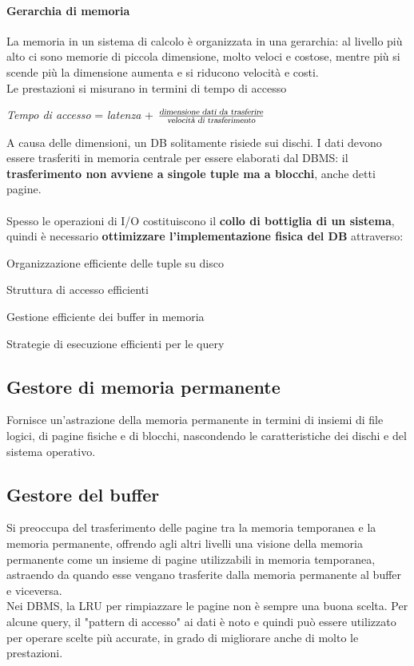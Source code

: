 \documentclass[10pt]{book}
\begin{document}
\paragraph{Gerarchia di memoria} La memoria in un sistema di calcolo è organizzata in una gerarchia: al livello più alto ci sono memorie di piccola dimensione, molto veloci e costose, mentre più si scende più la dimensione aumenta e si riducono velocità e costi.\\
Le prestazioni si misurano in termini di tempo di accesso
\begin{center}
\textsl{Tempo di accesso} = \textsl{latenza} + $\frac{\textsl{dimensione dati da trasferire}}{\textsl{velocità di trasferimento}}$
\end{center}
A causa delle dimensioni, un DB solitamente risiede sui dischi. I dati devono essere trasferiti in memoria centrale per essere elaborati dal DBMS: il \textbf{trasferimento non avviene a singole tuple ma a blocchi}, anche detti pagine.\\\\
\pagebreak
Spesso le operazioni di I/O costituiscono il \textbf{collo di bottiglia di un sistema}, quindi è necessario \textbf{ottimizzare l'implementazione fisica del DB} attraverso:
\begin{list}{}{}
	\item Organizzazione efficiente delle tuple su disco
	\item Struttura di accesso efficienti
	\item Gestione efficiente dei buffer in memoria
	\item Strategie di esecuzione efficienti per le query
\end{list}
\subsection{Gestore di memoria permanente} Fornisce un'astrazione della memoria permanente in termini di insiemi di file logici, di pagine fisiche e di blocchi, nascondendo le caratteristiche dei dischi e del sistema operativo.
\subsection{Gestore del buffer} Si preoccupa del trasferimento delle pagine tra la memoria temporanea e la memoria permanente, offrendo agli altri livelli una visione della memoria permanente come un insieme di pagine utilizzabili in memoria temporanea, astraendo da quando esse vengano trasferite dalla memoria permanente al buffer e viceversa.\\
Nei DBMS, la LRU per rimpiazzare le pagine non è sempre una buona scelta. Per alcune query, il "pattern di accesso" ai dati è noto e quindi può essere utilizzato per operare scelte più accurate, in grado di migliorare anche di molto le prestazioni.
\end{document}
